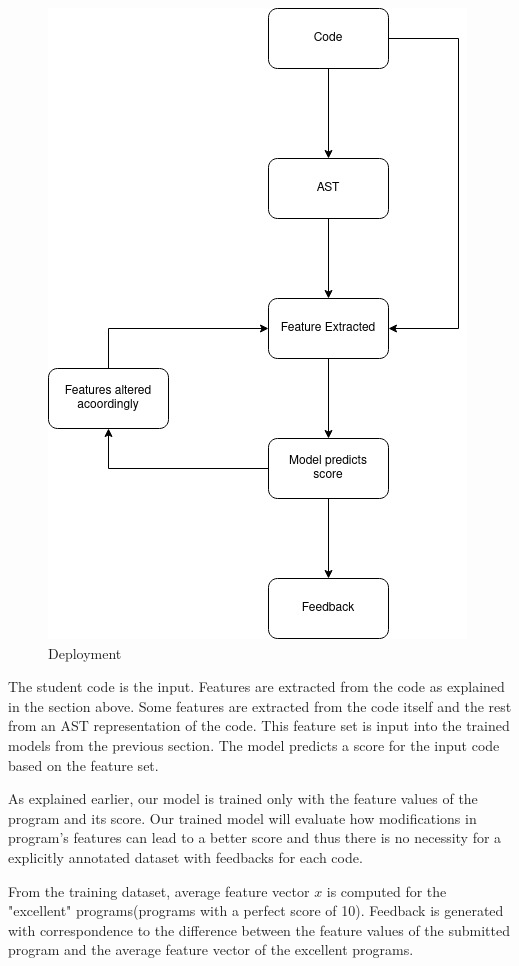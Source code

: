 \begin{figure}[H]
\centering
\includegraphics[scale=0.7]{./Deployment.jpg}
\caption{Deployment}
\label{fig1}
\end{figure}

The student code is the input. Features are extracted from the code as
explained in the section above. Some features are extracted from the
code itself and the rest from an AST representation of the code. This
feature set is input into the trained models from the previous
section. The model predicts a score for the input code based on the
feature set.

As explained earlier, our model is trained only with the feature values of the program and its score. Our trained model will evaluate how modifications in program's features can lead to a better score and thus there is no necessity for a explicitly annotated dataset with feedbacks for each code. 

From the training dataset, average feature vector $x$ is computed for the "excellent" programs(programs with a perfect score of 10). Feedback is generated with correspondence to the difference between the feature values of the submitted program and the average feature vector of the excellent programs.



